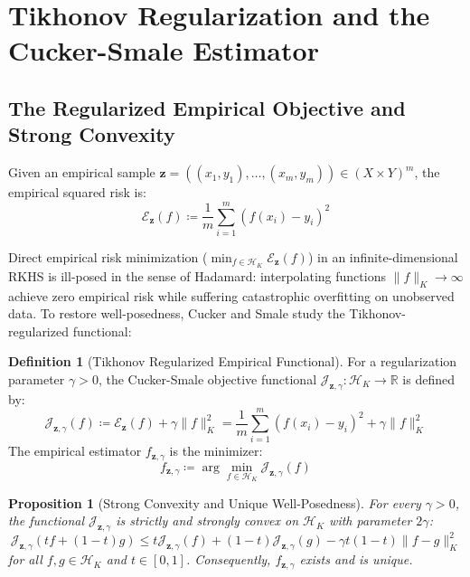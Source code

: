 \documentclass[11pt,a4paper]{article}
\newtheorem{proposition}[theorem]{Proposition}
\theoremstyle{definition}
\newtheorem{definition}[theorem]{Definition}
\begin{document}
\section{Tikhonov Regularization and the Cucker-Smale Estimator}\label{sec:tikhonov}

\subsection{The Regularized Empirical Objective and Strong Convexity}

Given an empirical sample $\mathbf{z} = ((x_1, y_1), \dots, (x_m, y_m)) \in (X \times Y)^m$, the empirical squared risk is:
\begin{equation}\label{eq:empirical_risk}
\mathcal{E}_{\mathbf{z}}(f) \coloneqq \frac{1}{m} \sum_{i=1}^m (f(x_i) - y_i)^2
\end{equation}

Direct empirical risk minimization ($\min_{f \in \mathcal{H}_K} \mathcal{E}_{\mathbf{z}}(f)$) in an infinite-dimensional RKHS is ill-posed in the sense of Hadamard: interpolating functions $\|f\|_K \to \infty$ achieve zero empirical risk while suffering catastrophic overfitting on unobserved data.
To restore well-posedness, Cucker and Smale \cite{cucker2002} study the Tikhonov-regularized functional:

\begin{definition}[Tikhonov Regularized Empirical Functional]\label{def:tikhonov}
For a regularization parameter $\gamma > 0$, the Cucker-Smale objective functional $\mathcal{J}_{\mathbf{z}, \gamma}: \mathcal{H}_K \to \mathbb{R}$ is defined by:
\begin{equation}\label{eq:tikhonov_functional}
\mathcal{J}_{\mathbf{z}, \gamma}(f) \coloneqq \mathcal{E}_{\mathbf{z}}(f) + \gamma \|f\|_K^2 = \frac{1}{m} \sum_{i=1}^m (f(x_i) - y_i)^2 + \gamma \|f\|_K^2
\end{equation}
The empirical estimator $f_{\mathbf{z}, \gamma}$ is the minimizer:
\begin{equation}\label{eq:tikhonov_minimizer}
f_{\mathbf{z}, \gamma} \coloneqq \arg\min_{f \in \mathcal{H}_K} \mathcal{J}_{\mathbf{z}, \gamma}(f)
\end{equation}
\end{definition}

\begin{proposition}[Strong Convexity and Unique Well-Posedness]\label{prop:strong_convexity}
For every $\gamma > 0$, the functional $\mathcal{J}_{\mathbf{z}, \gamma}$ is strictly and strongly convex on $\mathcal{H}_K$ with parameter $2\gamma$:
\begin{equation}\label{eq:strong_convexity}
\mathcal{J}_{\mathbf{z}, \gamma}(t f + (1-t) g) \le t \mathcal{J}_{\mathbf{z}, \gamma}(f) + (1-t) \mathcal{J}_{\mathbf{z}, \gamma}(g) - \gamma t (1-t) \|f - g\|_K^2
\end{equation}
for all $f, g \in \mathcal{H}_K$ and $t \in [0, 1]$. Consequently, $f_{\mathbf{z}, \gamma}$ exists and is unique.
\end{proposition}
\end{document}
